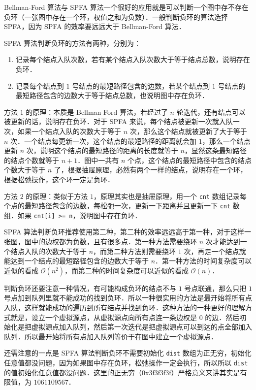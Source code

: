 Bellman-Ford 算法与 SPFA 算法一个很好的应用就是可以判断一个图中存不存在负环（一张图中存在一个环，权值之和为负数）．一般判断负环的算法选择 SPFA，因为 SPFA 的效率要远远大于 Bellman-Ford 算法．

SPFA 算法判断负环的方法有两种，分别为：

\begin{enumerate}
\item 记录每个结点入队次数，若有某个结点入队次数大于等于结点总数，说明存在负环．
\item 记录每个结点到 $1$ 号结点的最短路径包含的边数，若某个结点到 $1$ 号结点的最短路径包含的边数大于等于结点总数，也说明图中存在负环．
\end{enumerate}

方法 $1$ 的原理：本质是 Bellman-Ford 算法，若经过了 $n$ 轮迭代，还有结点可以被更新的话，说明存在负环．对于 SPFA 来说，每个结点被更新一次就入队一次，如果一个结点入队的次数大于等于 $n$ 次，那么这个结点就被更新了大于等于 $n$ 次．一个结点每更新一次，这个结点的最短路径的距离就会加 $1$，那么一个结点更新 $n$ 次，说明这个结点的最短路径的距离的长度就等于 $n$，显然这条最短路径的结点个数就等于 $n + 1$．图中一共有 $n$ 个点，这个结点的最短路径中包含的结点个数大于等于 $n$ 了，根据抽屉原理，必然有两个一样的结点，说明存在一个环，根据松弛操作，这个环一定是负环．

方法 $2$ 的原理：类似于方法 $1$，原理其实也是抽屉原理，用一个 \verb|cnt| 数组记录每个点的最短路径包含的边数，每松弛一次，更新一下距离并且更新一下 \verb|cnt| 数组．如果 \verb|cnt[i] >= n|，说明图中存在负环．

SPFA 算法判断负环推荐使用第二种，第二种的效率远远高于第一种，对于这样一张图，图中的边权都为负数，且有很多点．第一种方法需要绕环 $n$ 次才能达到一个结点入队的次数大于等于 $n$，而第二种方法则需要绕环 $1$ 次，再走一个结点就能达到一个结点的最短路径包含的边数大于等于 $n$．第一种方法的时间复杂度可以近似的看成 $\mathcal{O}(n^2)$，而第二种的时间复杂度可以近似的看成 $\mathcal{O}(n)$．

判断负环还要注意一种情况，有可能构成负环的结点不与 $1$ 号点联通，那么只把 $1$ 号点加到队列里就不能成功的找到负环．所以一种很实用的方法是最开始将所有点入队，这样就能成功的遍历到所有结点并找到负环．这种方法的一种更好的理解方式就是，设立一个虚拟源点，从虚拟源点向所有点连一条边权是 $0$ 的边．然后初始化是把虚拟源点加入队列，然后第一次迭代是把虚拟源点可以到达的点全部加入队列．所以最开始将所有点加入队列等价于在图中建立一个虚拟源点．

还需注意的一点是 SPFA 算法判断负环不需要初始化 \verb|dist| 数组为正无穷，初始化任意值都没问题，因为如果图中存在负环，松弛操作一定会执行，所以所以 \verb|dist| 的值初始化任意值都没问题．这里的正无穷（0x3f3f3f3f）严格意义来讲其实是有限值，为 $1061109567$．

